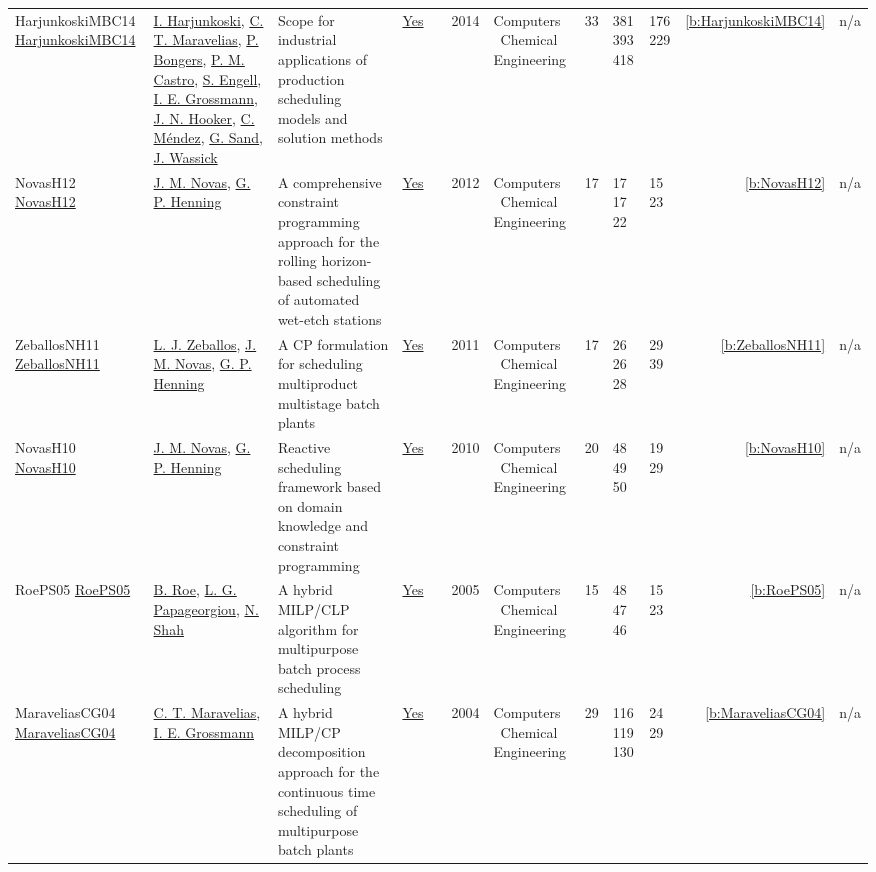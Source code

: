 {\begin{longtable}{>{\raggedright\arraybackslash}p{3cm}>{\raggedright\arraybackslash}p{4.5cm}>{\raggedright\arraybackslash}p{6.0cm}rrrp{2.5cm}rp{1cm}p{1cm}rr}
HarjunkoskiMBC14 \href{http://dx.doi.org/10.1016/j.compchemeng.2013.12.001}{HarjunkoskiMBC14} & \hyperref[auth:a871]{I. Harjunkoski}, \hyperref[auth:a381]{C. T. Maravelias}, \hyperref[auth:a938]{P. Bongers}, \hyperref[auth:a891]{P. M. Castro}, \hyperref[auth:a70]{S. Engell}, \hyperref[auth:a382]{I. E. Grossmann}, \hyperref[auth:a160]{J. N. Hooker}, \hyperref[auth:a939]{C. Méndez}, \hyperref[auth:a940]{G. Sand}, \hyperref[auth:a941]{J. Wassick} & \cellcolor{green!10}Scope for industrial applications of production scheduling models and solution methods & \href{../works/HarjunkoskiMBC14.pdf}{Yes} & \cite{HarjunkoskiMBC14} & 2014 & Computers \  Chemical Engineering & 33 & 381 393 418 & 176 229 & \ref{b:HarjunkoskiMBC14} & n/a\\
NovasH12 \href{https://doi.org/10.1016/j.compchemeng.2012.01.005}{NovasH12} & \hyperref[auth:a524]{J. M. Novas}, \hyperref[auth:a588]{G. P. Henning} & A comprehensive constraint programming approach for the rolling horizon-based scheduling of automated wet-etch stations & \href{../works/NovasH12.pdf}{Yes} & \cite{NovasH12} & 2012 & Computers \  Chemical Engineering & 17 & 17 17 22 & 15 23 & \ref{b:NovasH12} & n/a\\
ZeballosNH11 \href{http://dx.doi.org/10.1016/j.compchemeng.2011.01.043}{ZeballosNH11} & \hyperref[auth:a621]{L. J. Zeballos}, \hyperref[auth:a524]{J. M. Novas}, \hyperref[auth:a588]{G. P. Henning} & A CP formulation for scheduling multiproduct multistage batch plants & \href{../works/ZeballosNH11.pdf}{Yes} & \cite{ZeballosNH11} & 2011 & Computers \  Chemical Engineering & 17 & 26 26 28 & 29 39 & \ref{b:ZeballosNH11} & n/a\\
NovasH10 \href{https://doi.org/10.1016/j.compchemeng.2010.07.011}{NovasH10} & \hyperref[auth:a524]{J. M. Novas}, \hyperref[auth:a588]{G. P. Henning} & \cellcolor{green!10}Reactive scheduling framework based on domain knowledge and constraint programming & \href{../works/NovasH10.pdf}{Yes} & \cite{NovasH10} & 2010 & Computers \  Chemical Engineering & 20 & 48 49 50 & 19 29 & \ref{b:NovasH10} & n/a\\
RoePS05 \href{http://dx.doi.org/10.1016/j.compchemeng.2005.02.024}{RoePS05} & \hyperref[auth:a1242]{B. Roe}, \hyperref[auth:a1243]{L. G. Papageorgiou}, \hyperref[auth:a1244]{N. Shah} & A hybrid MILP/CLP algorithm for multipurpose batch process scheduling & \href{../works/RoePS05.pdf}{Yes} & \cite{RoePS05} & 2005 & Computers \  Chemical Engineering & 15 & 48 47 46 & 15 23 & \ref{b:RoePS05} & n/a\\
MaraveliasCG04 \href{http://dx.doi.org/10.1016/j.compchemeng.2004.03.016}{MaraveliasCG04} & \hyperref[auth:a381]{C. T. Maravelias}, \hyperref[auth:a382]{I. E. Grossmann} & A hybrid MILP/CP decomposition approach for the continuous time scheduling of multipurpose batch plants & \href{../works/MaraveliasCG04.pdf}{Yes} & \cite{MaraveliasCG04} & 2004 & Computers \  Chemical Engineering & 29 & 116 119 130 & 24 29 & \ref{b:MaraveliasCG04} & n/a\\

\end{longtable}}

